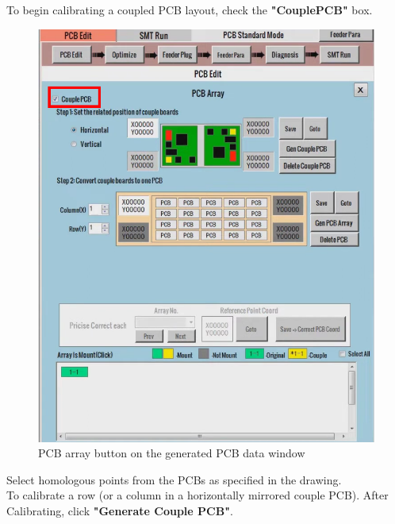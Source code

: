 \documentclass[a4paper,10pt]{report}
\begin{document}
To begin calibrating a coupled PCB layout, check the \textbf{"CouplePCB"} box.\\
\begin{figure}[!htb]
 \centering
 \includegraphics[width=1\textwidth]{scrot8.png}
 \caption{PCB array button on the generated PCB data window}
\end{figure}
\newpage
Select homologous points from the PCBs as specified in the drawing.\\
To calibrate a row (or a column in a horizontally mirrored couple PCB).
After Calibrating, click \textbf{"Generate Couple PCB"}.
\end{document}
